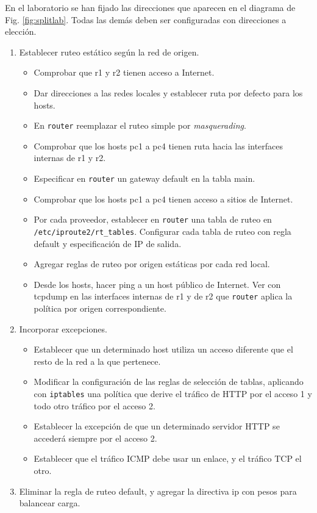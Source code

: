 En el laboratorio se han fijado las direcciones que aparecen en el diagrama de Fig. \ref{fig:splitlab}. Todas las demás deben ser configuradas con direcciones a elección. 
\begin{enumerate} 
	\item Establecer ruteo estático según la red de origen.
	\begin{itemize}
	\item Comprobar que r1 y r2 tienen acceso a Internet. 
	\item Dar direcciones a las redes locales y establecer ruta por defecto para los hosts. 
	\item En \texttt{router} reemplazar el ruteo simple por \textit{masquerading}.	
	\item Comprobar que los hosts pc1 a pc4 tienen ruta hacia las interfaces internas de r1 y r2. 
	\item Especificar en \texttt{router} un gateway default en la tabla main. 
	\item Comprobar que los hosts pc1 a pc4 tienen acceso a sitios de Internet. 
	\item Por cada proveedor, establecer en \texttt{router} una tabla de ruteo en \texttt{/etc/iproute2/rt\_tables}. Configurar cada tabla de ruteo con regla default y especificación de IP de salida. 
	\item Agregar reglas de ruteo por origen estáticas por cada red local. 
	\item Desde los hosts, hacer ping a un host público de Internet. Ver con tcpdump en las interfaces internas de r1 y de r2 que \texttt{router}  aplica la política por origen correspondiente. 
	\end{itemize}
	\item Incorporar excepciones.
	\begin{itemize}
		\item Establecer que un determinado host utiliza un acceso diferente que el resto de la red a la que pertenece.	
		\item Modificar la configuración de las reglas de selección de tablas, aplicando con \texttt{iptables} una política que derive el tráfico de HTTP por el acceso 1 y todo otro tráfico por el acceso 2.
		\item Establecer la excepción de que un determinado servidor HTTP se accederá siempre por el acceso 2. 
		\item Establecer que el tráfico ICMP debe usar un enlace, y el tráfico TCP el otro.
	\end{itemize}
	\item Eliminar la regla de ruteo default, y agregar la directiva ip con pesos para balancear carga. 

\end{enumerate}
